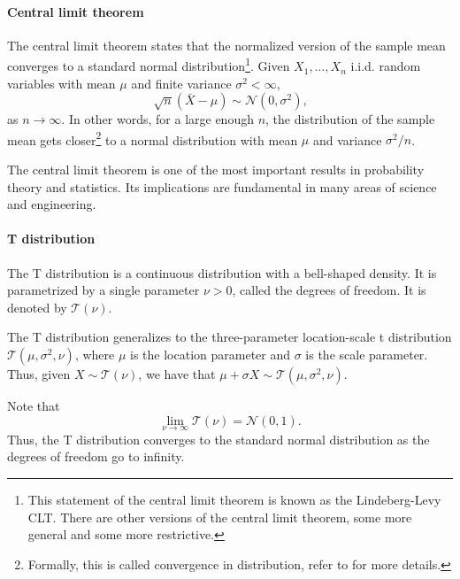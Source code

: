 \paragraph{Central limit theorem}  The central limit theorem states that the normalized
version of the sample mean converges to a standard normal distribution\footnote{This
statement of the central limit theorem is known as the Lindeberg-Levy CLT.  There are
other versions of the central limit theorem, some more general and some more
restrictive.}. Given $X_1, \dots, X_n$ i.i.d. random variables with mean $\mu$ and finite
variance $\sigma^2 < \infty$,
\begin{equation*}
  \sqrt{n} (\bar{X} - \mu) \sim \mathcal{N}(0, \sigma^2)\text{,}
\end{equation*}
as $n \rightarrow \infty$.  In other words, for a large enough $n$, the distribution of
the sample mean gets closer\footnote{Formally, this is called convergence in distribution,
refer to  for more details.} to a normal distribution with mean
$\mu$ and variance $\sigma^2/n$.

The central limit theorem is one of the most important results in probability theory and
statistics.  Its implications are fundamental in many areas of science and engineering.

\paragraph{T distribution} The T distribution is a continuous distribution with a
bell-shaped density.  It is parametrized by a single parameter $\nu > 0$, called the
degrees of freedom.  It is denoted by $\mathcal{T}(\nu)$.


The T distribution generalizes to the three-parameter location-scale t distribution
$\mathcal{T}(\mu, \sigma^2, \nu)$, where $\mu$ is the location parameter and $\sigma$ is
the scale parameter.  Thus, given $X \sim \mathcal{T}(\nu)$, we have that
$\mu + \sigma X \sim \mathcal{T}(\mu, \sigma^2, \nu)$.

Note that $$\lim_{\nu \rightarrow \infty} \mathcal{T}(\nu) = \mathcal{N}(0, 1)\text{.}$$
Thus, the T distribution converges to the standard normal distribution as the degrees of
freedom go to infinity.

